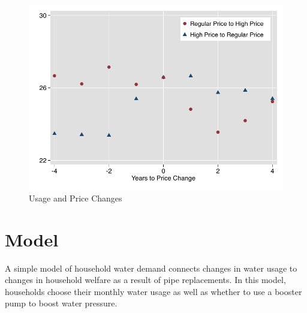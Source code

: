 \documentclass[12pt,table]{article}
\begin{document}
\begin{figure}
\begin{center}
\caption{Usage and Price Changes}\label{figure:usagepricechanges}
\includegraphics[scale=1]{tables/r_to_s_graph.pdf}
\end{center}
\end{figure}

\section{Model}

A simple model of household water demand connects changes in water usage to changes in household welfare as a result of pipe replacements.  In this model, households choose their monthly water usage as well as whether to use a booster pump to boost water pressure.  
\end{document}
